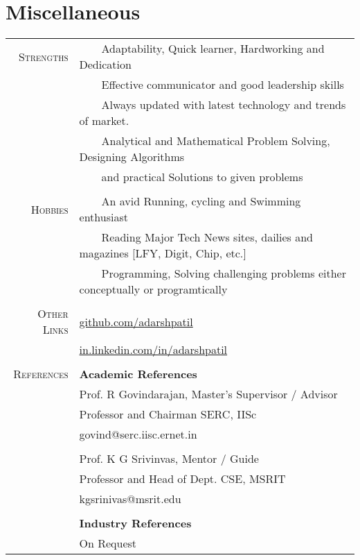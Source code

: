 \documentclass[a4paper,10pt]{article} %
\newcommand{\tabitem}{~~\llap{\textbullet}~~}
\begin{document}


\section{Miscellaneous}
\begin{tabular}{rl}
\textsc{Strengths} & \tabitem Adaptability, Quick learner, Hardworking and Dedication\\
& \tabitem Effective communicator and good leadership skills \\
& \tabitem Always updated with latest technology and trends of market.\\
& \tabitem Analytical and Mathematical Problem Solving, Designing Algorithms \\
& ~~~~and practical Solutions to given problems \\
& \\
\textsc{Hobbies} & \tabitem An avid Running, cycling and Swimming enthusiast\\
& \tabitem Reading Major Tech News sites, dailies and magazines [LFY, Digit, Chip, etc.] \\
& \tabitem Programming, Solving challenging problems either conceptually or programtically \\
& \\
\textsc{Other Links} & \href{https://github.com/adarshpatil}{github.com/adarshpatil} \\
& \href{http://in.linkedin.com/in/adarshpatil}{in.linkedin.com/in/adarshpatil}\\
&\\
\textsc{References} & \textbf{Academic References} \\
& Prof. R Govindarajan, Master's Supervisor / Advisor \\
& Professor and Chairman SERC, IISc\\
& govind@serc.iisc.ernet.in \\
&\\
& Prof. K G Srivinvas, Mentor / Guide  \\
& Professor and Head of Dept. CSE, MSRIT \\
& kgsrinivas@msrit.edu \\
&\\

& \textbf{Industry References} \\
& On Request \\
\end{tabular}
\end{document}
